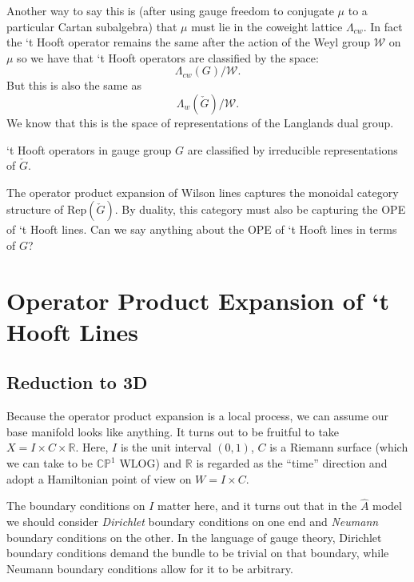 		Another way to say this is (after using gauge freedom to conjugate $\mu$ to a particular Cartan subalgebra) that $\mu$ must lie in the coweight lattice $\Lambda_{cw}$. In fact the `t Hooft operator remains the same after the action of the Weyl group $\mathcal W$ on $\mu$ so we have that `t Hooft operators are classified by the space:
			\[
				\Lambda_{cw}(G)/\mathcal W.
			\]
			But this is also the same as 
			\[
				\Lambda_{w}(\check G)/\mathcal W.	
			\]
			We know that this is the space of representations of the Langlands dual group. 
			\begin{prop}
				`t Hooft operators in gauge group $G$ are classified by irreducible representations of $\check G$.
			\end{prop}
	
			The operator product expansion of Wilson lines captures the monoidal category structure of $\mathrm{Rep}(\check G)$. By duality, this category must also be capturing the OPE of `t Hooft lines. Can we say anything about the OPE of `t Hooft lines in terms of $G$?


	\section{Operator Product Expansion of `t Hooft Lines}
	
	\subsection{Reduction to 3D}
	
	Because the operator product expansion is a local process, we can assume our base manifold looks like anything. It turns out to be fruitful to take $X = I \times C \times \mathbb R$. Here, $I$ is the unit interval $(0, 1)$, $C$ is a Riemann surface (which we can take to be $\mathbb{CP}^1$ WLOG) and $\mathbb R$ is regarded as the ``time'' direction and adopt a Hamiltonian point of view on $W = I \times C$. 
	
	The boundary conditions on $I$ matter here, and it turns out that in the $\hat A$ model we should consider \emph{Dirichlet} boundary conditions on one end and \emph{Neumann} boundary conditions on the other. In the language of gauge theory, Dirichlet boundary conditions demand the bundle to be trivial on that boundary, while Neumann boundary conditions allow for it to be arbitrary.
	
